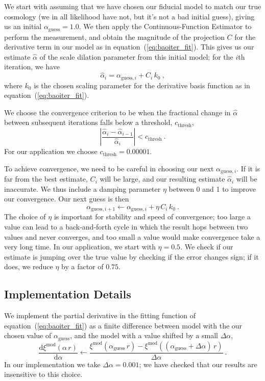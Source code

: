 \documentclass[modern]{aastex62}
\newcommand{\est}{the Continuous-Function Estimator\xspace}
\newcommand{\eqt}[1]{equation~(\ref{#1})}
\newcommand{\dd}{\mathrm{d}}
\begin{document}
We start with assuming that we have chosen our fiducial model to match our true cosmology (we in all likelihood have not, but it's not a bad initial guess), giving us an initial $\alpha_\mathrm{guess} = 1.0$. 
We then apply \est to perform the measurement, and obtain the magnitude of the projection $C$ for the derivative term in our model as in \eqt{eq:baoiter_fit}. 
This gives us our estimate $\hat{\alpha}$ of the scale dilation parameter from this initial model; for the $i$th iteration, we have
\begin{equation}
    \hat{\alpha}_{i} = \alpha_{\mathrm{guess},i} + C_i \, k_0 ~,
\end{equation}
where $k_0$ is the chosen scaling parameter for the derivative basis function as in \eqt{eq:baoiter_fit}.

We choose the convergence criterion to be when the fractional change in $\hat{\alpha}$ between subsequent iterations falls below a threshold, $c_\mathrm{thresh}$,
\begin{equation}
    \left| \frac{\hat{\alpha}_i - \hat{\alpha}_{i-1}}{\hat{\alpha}_i} \right| < c_\mathrm{thresh} ~.
\end{equation}
For our application we choose $c_\mathrm{thresh} = 0.00001$.

To achieve convergence, we need to be careful in choosing our next $\alpha_{\mathrm{guess},i}$.
If it is far from the best estimate, $C_i$ will be large, and our resulting estimate $\hat{\alpha}_{i}$ will be inaccurate.
We thus include a damping parameter $\eta$ between 0 and 1 to improve our convergence.
Our next guess is then
\begin{equation}
    \alpha_{\mathrm{guess},i+1} \leftarrow \alpha_{\mathrm{guess},i} + \eta\,C_i\,k_0 ~.
\end{equation}
The choice of $\eta$ is important for stability and speed of convergence; too large a value can lead to a back-and-forth cycle in which the result hops between two values and never converges, and too small a value would make convergence take a very long time.
In our application, we start with $\eta=0.5$.
We check if our estimate is jumping over the true value by checking if the error changes sign; if it does, we reduce $\eta$ by a factor of $0.75$.

\subsection{Implementation Details}

We implement the partial derivative in the fitting function of \eqt{eq:baoiter_fit} as a finite difference between model with the our chosen value of $\alpha_\mathrm{guess}$, and the model with a value shifted by a small $\Delta \alpha$,
\begin{equation}
    \frac{\dd \xi^\mathrm{mod}(\alpha \, r)}{\dd \alpha} \leftarrow \frac{\xi^\mathrm{mod}(\alpha_\mathrm{guess} \, r) - \xi^\mathrm{mod}((\alpha_\mathrm{guess} + \Delta \alpha) \, r)}{\Delta \alpha} ~.
\end{equation}
In our implementation we take $\Delta \alpha = 0.001$; we have checked that our results are insensitive to this choice.
\end{document}
